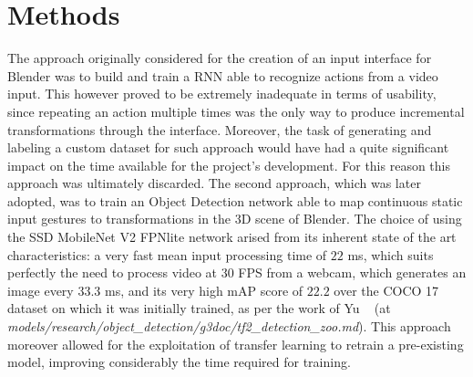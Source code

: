 \documentclass[10pt,twocolumn,letterpaper]{article}
\begin{document}
\section{Methods}
\begin{flushleft}
The approach originally considered for the creation of an input interface for Blender was to build and train a RNN able to recognize actions from a video input. This however proved to be extremely inadequate in terms of usability, since repeating an action multiple times was the only way to produce incremental transformations through the interface. Moreover, the task of generating and labeling a custom dataset for such approach would have had a quite significant impact on the time available for the project's development. For this reason this approach was ultimately discarded.\linebreak
The second approach, which was later adopted, was to train an Object Detection network able to map continuous static input gestures to transformations in the 3D scene of Blender. The choice of using the SSD MobileNet V2 FPNlite network arised from its inherent state of the art characteristics: a very fast mean input processing time of $22$ ms, which suits perfectly the need to process video at 30 FPS from a webcam, which generates an image every $33.3$ ms, and its very high mAP score of $22.2$ over the COCO 17 dataset on which it was initially trained, as per the work of Yu \etal~\cite{tensorflowmodelgarden2020} (at \textit{models/research/object\_detection/g3doc/tf2\_detection\_zoo.md}).\linebreak
This approach moreover allowed for the exploitation of transfer learning to retrain a pre-existing model, improving considerably the time required for training.
\end{flushleft}
\end{document}
